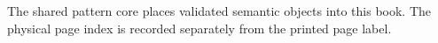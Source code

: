 \documentclass[twoside,openany,10pt]{book}
\begin{document}
\tableofcontents
\bigskip
The shared pattern core places validated semantic objects into this book.
The physical page index is recorded separately from the printed page label.
\par\medskip
{}
\clearpage
\setcounter{page}{42}


\end{document}
